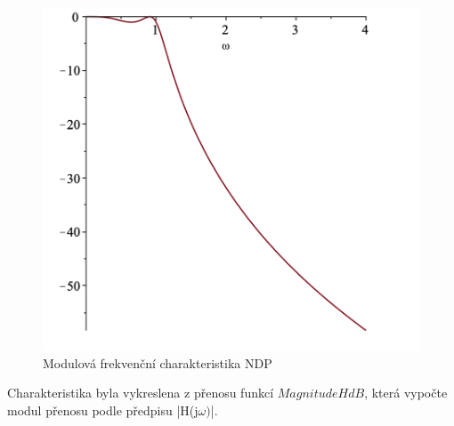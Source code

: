 \documentclass[twoside]{article}
\begin{document}
\begin{figure}[H]
\centering
\includegraphics[scale=0.5]{sch02.png}
\caption{Modulová frekvenční charakteristika NDP}
\end{figure}
\noindent Charakteristika byla vykreslena z přenosu funkcí $MagnitudeHdB$, která vypočte modul přenosu podle předpisu |H(j$\omega)$|.
\end{document}
